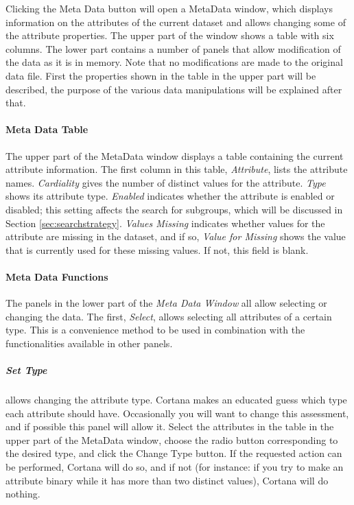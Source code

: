 \documentclass{article}
\begin{document}
Clicking the Meta Data button will open a MetaData window, which displays
information on the attributes of the current dataset and allows changing
some of the attribute properties.  The upper part of the window shows a
table with six columns.  The lower part contains a number of panels that
allow modification of the data as it is in memory.  Note that no
modifications are made to the original data file.  First the properties
shown in the table in the upper part will be described, the purpose of the
various data manipulations will be explained after that.

\paragraph{Meta Data Table}
\label{meta-data-window:meta-data-table}

The upper part of the MetaData window displays a table containing the current
attribute information.  The first column in this table, \emph{Attribute},
lists the attribute names.  \emph{Cardiality} gives the number of distinct
values for the attribute.  \emph{Type} shows its attribute \gls{type}. 
\emph{Enabled} indicates whether the attribute is \gls{enabled} or
\gls{disabled}; this setting affects the search for subgroups, which will be
discussed in Section \ref{sec:searchstrategy}.  \emph{Values Missing}
indicates whether values for the attribute are missing in the dataset, and
if so, \emph{Value for Missing} shows the value that is currently used for
these missing values.  If not, this field is blank.

\paragraph{Meta Data Functions}
\label{meta-data-window:meta-data-functions}

The panels in the lower part of the \emph{Meta Data Window} all allow
selecting or changing the data.  The first, \emph{Select}, allows selecting
all attributes of a certain type.  This is a convenience method to be used
in combination with the functionalities available in other panels.

\subparagraph{Set Type} allows changing the attribute \gls{type}.  Cortana
makes an educated guess which \gls{type} each attribute should have. 
Occasionally you will want to change this assessment, and if possible
this panel will allow it.  Select the attributes in the table in the upper
part of the MetaData window, choose the radio button corresponding to the
desired type, and click the Change Type button.  If the requested action can
be performed, Cortana will do so, and if not (for instance: if you try to
make an attribute binary while it has more than two distinct values),
Cortana will do nothing.
\end{document}
